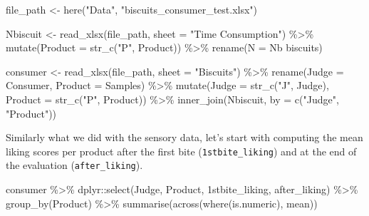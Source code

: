 \documentclass[
]{krantz}
\makeatletter
\newenvironment{Shaded}{\begin{snugshade}}{\end{snugshade}}
\newcommand{\AttributeTok}[1]{\textcolor[rgb]{0.61,0.61,0.61}{#1}}
\newcommand{\FunctionTok}[1]{\textcolor[rgb]{0,0,0}{#1}}
\newcommand{\NormalTok}[1]{#1}
\newcommand{\OtherTok}[1]{\textcolor[rgb]{0.37,0.37,0.37}{#1}}
\newcommand{\SpecialCharTok}[1]{\textcolor[rgb]{0,0,0}{#1}}
\newcommand{\StringTok}[1]{\textcolor[rgb]{0.5,0.5,0.5}{#1}}
\newenvironment{kframe}{%
\medskip{}
\setlength{\fboxsep}{.8em}
 \def\at@end@of@kframe{}%
 \ifinner\ifhmode%
  \def\at@end@of@kframe{\end{minipage}}%
  \begin{minipage}{\columnwidth}%
 \fi\fi%
 \def\FrameCommand##1{\hskip\@totalleftmargin \hskip-\fboxsep
 \colorbox{shadecolor}{##1}\hskip-\fboxsep
     \hskip-\linewidth \hskip-\@totalleftmargin \hskip\columnwidth}%
 \MakeFramed {\advance\hsize-\width
   \@totalleftmargin\z@ \linewidth\hsize
   \@setminipage}}%
 {\par\unskip\endMakeFramed%
 \at@end@of@kframe}
\renewenvironment{Shaded}{\begin{kframe}}{\end{kframe}}
\makeatother
\begin{document}
\begin{Shaded}
\begin{Highlighting}[]
\NormalTok{file\_path }\OtherTok{\textless{}{-}} \FunctionTok{here}\NormalTok{(}\StringTok{"Data"}\NormalTok{, }\StringTok{"biscuits\_consumer\_test.xlsx"}\NormalTok{)}

\NormalTok{Nbiscuit }\OtherTok{\textless{}{-}} \FunctionTok{read\_xlsx}\NormalTok{(file\_path, }\AttributeTok{sheet =} \StringTok{"Time Consumption"}\NormalTok{) }\SpecialCharTok{\%\textgreater{}\%}
  \FunctionTok{mutate}\NormalTok{(}\AttributeTok{Product =} \FunctionTok{str\_c}\NormalTok{(}\StringTok{"P"}\NormalTok{, Product)) }\SpecialCharTok{\%\textgreater{}\%}
  \FunctionTok{rename}\NormalTok{(}\AttributeTok{N =} \StringTok{\textasciigrave{}}\AttributeTok{Nb biscuits}\StringTok{\textasciigrave{}}\NormalTok{)}

\NormalTok{consumer }\OtherTok{\textless{}{-}} \FunctionTok{read\_xlsx}\NormalTok{(file\_path, }\AttributeTok{sheet =} \StringTok{"Biscuits"}\NormalTok{) }\SpecialCharTok{\%\textgreater{}\%}
  \FunctionTok{rename}\NormalTok{(}\AttributeTok{Judge =}\NormalTok{ Consumer, }\AttributeTok{Product =}\NormalTok{ Samples) }\SpecialCharTok{\%\textgreater{}\%}
  \FunctionTok{mutate}\NormalTok{(}\AttributeTok{Judge =} \FunctionTok{str\_c}\NormalTok{(}\StringTok{"J"}\NormalTok{, Judge), }\AttributeTok{Product =} \FunctionTok{str\_c}\NormalTok{(}\StringTok{"P"}\NormalTok{, Product)) }\SpecialCharTok{\%\textgreater{}\%}
  \FunctionTok{inner\_join}\NormalTok{(Nbiscuit, }\AttributeTok{by =} \FunctionTok{c}\NormalTok{(}\StringTok{"Judge"}\NormalTok{, }\StringTok{"Product"}\NormalTok{))}
\end{Highlighting}
\end{Shaded}

Similarly what we did with the sensory data, let's start with computing the mean liking scores per product after the first bite (\texttt{1stbite\_liking}) and at the end of the evaluation (\texttt{after\_liking}).

\begin{Shaded}
\begin{Highlighting}[]
\NormalTok{consumer }\SpecialCharTok{\%\textgreater{}\%}
\NormalTok{  dplyr}\SpecialCharTok{::}\FunctionTok{select}\NormalTok{(Judge, Product, }\StringTok{\textasciigrave{}}\AttributeTok{1stbite\_liking}\StringTok{\textasciigrave{}}\NormalTok{, }\StringTok{\textasciigrave{}}\AttributeTok{after\_liking}\StringTok{\textasciigrave{}}\NormalTok{) }\SpecialCharTok{\%\textgreater{}\%}
  \FunctionTok{group\_by}\NormalTok{(Product) }\SpecialCharTok{\%\textgreater{}\%}
  \FunctionTok{summarise}\NormalTok{(}\FunctionTok{across}\NormalTok{(}\FunctionTok{where}\NormalTok{(is.numeric), mean))}
\end{Highlighting}
\end{Shaded}
\end{document}
